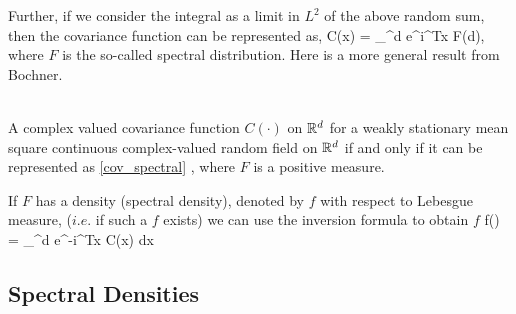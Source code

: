 Further, if we consider the integral as a limit in $L^2$ of the above random sum, then the covariance function can be represented as,
\beq \label{cov_spectral}
C(x) = \int_{^d} e^{i\omega^Tx} F(d\omega),
\eeq
where $F$ is the so-called spectral distribution. Here is a more general result from Bochner.

\begin{theorem}\hfill \\
A complex valued covariance function $C(\cdot)$ on $\mathbb{R}^d$ for a weakly stationary mean square continuous complex-valued random field on $\mathbb{R}^d$ if and only if it can be represented as \eqref{cov_spectral} , where $F$ is a positive measure.
\end{theorem}
If $F$ has a density (spectral density), denoted by $f$ with respect to Lebesgue measure, ($i.e.$ if such a $f$ exists) we can use the inversion formula to obtain $f$
\beq
f(\omega) =   \int_{\R^d} e^{-i\omega^Tx} C(x) dx
\eeq


\subsection{Spectral Densities}

